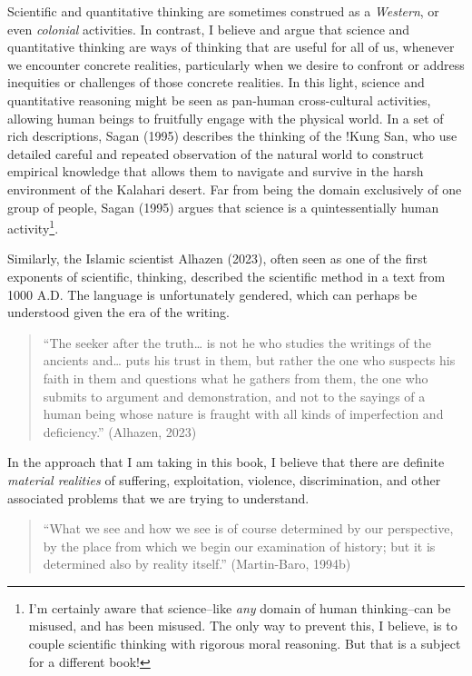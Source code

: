 \documentclass[
  letterpaper,
  DIV=11,
  numbers=noendperiod]{scrreprt}
\begin{document}
Scientific and quantitative thinking are sometimes construed as a
\emph{Western}, or even \emph{colonial} activities.
 In contrast, I believe and argue that
science and quantitative thinking are ways of thinking that are useful
for all of us, whenever we encounter concrete realities, particularly
when we desire to confront or address inequities or challenges of those
concrete realities. In this light, science and quantitative reasoning
might be seen as pan-human cross-cultural activities, allowing human
beings to fruitfully engage with the physical world. In a set of rich
descriptions, Sagan (1995) describes the thinking of the !Kung San,
 who use detailed careful and repeated observation of
the natural world to construct empirical knowledge that allows them to
navigate and survive in the harsh environment of the Kalahari desert.
Far from being the domain exclusively of one group of people, Sagan
(1995) argues that science is a quintessentially human
activity\footnote{I'm certainly aware that science--like \emph{any}
  domain of human thinking--can be misused, and has been misused. The
  only way to prevent this, I believe, is to couple scientific thinking
  with rigorous moral reasoning. But that is a subject for a different
  book!}.

Similarly, the Islamic scientist Alhazen (2023), often seen as one of
the first exponents of scientific, thinking, described the scientific
method in a text from 1000 A.D. The language is unfortunately gendered,
which can perhaps be understood given the era of the writing.

\begin{quote}
``The seeker after the truth\ldots{} is not he who studies the writings
of the ancients and\ldots{} puts his trust in them, but rather the one
who suspects his faith in them and questions what he gathers from them,
the one who submits to argument and demonstration, and not to the
sayings of a human being whose nature is fraught with all kinds of
imperfection and deficiency.'' (Alhazen, 2023)
\end{quote}

In the approach that I am taking in this book, I believe that there are
definite \emph{material realities} of suffering, exploitation, violence,
discrimination, and other associated problems that we are trying to
understand.

\begin{quote}
``What we see and how we see is of course determined by our perspective,
by the place from which we begin our examination of history; but it is
determined also by reality itself.'' (Martin-Baro, 1994b)
\end{quote}
\end{document}

